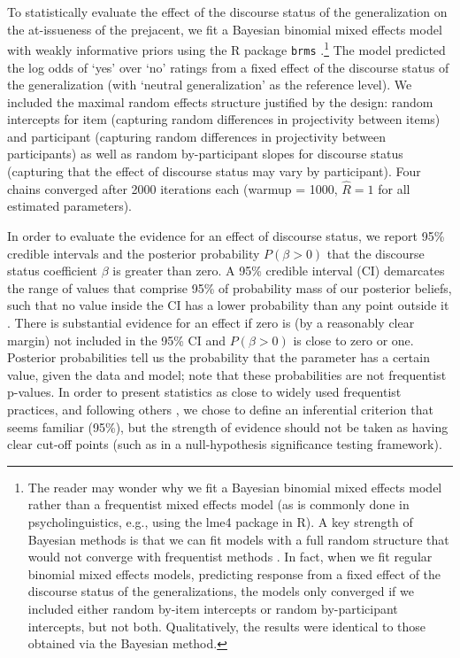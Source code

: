 \documentclass[11pt,fleqn]{article}
\newcommand{\6}{\mbox{$[\hspace*{-.6mm}[$}}
\newcommand{\9}{\mbox{$]\hspace*{-.6mm}]$}}
\begin{document}
To statistically evaluate the effect of the discourse status of the generalization on the at-issueness of the prejacent, we fit a Bayesian binomial mixed effects model with weakly informative priors using the R package \verb|brms| \citep{buerkner2017}.\footnote{The reader may wonder why we fit a Bayesian binomial mixed effects model rather than a frequentist mixed effects model (as is commonly done in psycholinguistics, e.g., using the lme4 package in R). A key strength of Bayesian methods is that we can fit models with a full random structure that would not converge with frequentist
methods \citep{Nicenboim2016}. In fact, when we fit regular binomial mixed effects models, predicting response from a fixed effect of the discourse status of the generalizations, the models only converged if we included either random by-item intercepts or random by-participant intercepts, but not both. Qualitatively, the results were identical to those obtained via the Bayesian method.} The model predicted the log odds of `yes' over `no' ratings from a fixed effect of the discourse status of the generalization (with `neutral generalization' as the reference level). We included the maximal random effects structure justified by the design: random intercepts for item (capturing random differences in projectivity between items) and participant (capturing random differences in projectivity between participants) as well as random by-participant slopes for discourse status (capturing that the effect of discourse status may vary by participant). Four chains converged after 2000 iterations each (warmup = 1000, \(\hat{R}=1\) for all estimated parameters).

In order to evaluate the evidence for an effect of discourse status, we report 95\% credible intervals and the posterior probability $P(\beta > 0)$ that the discourse status coefficient $\beta$ is greater than zero. A 95\% credible interval (CI) demarcates the range of values that comprise 95\% of probability mass of our posterior beliefs, such that no value inside the CI has a lower probability than any point outside it \citep{Jaynes1976, Morey2016}. There is substantial evidence for an effect if zero is (by a reasonably clear margin) not included in the 95\% CI and $P(\beta > 0)$ is close to zero or one. Posterior probabilities tell us the probability that the parameter has a certain value, given the data and model; note that these probabilities are not frequentist p-values. In order to present statistics as close to widely used frequentist practices, and following others \citep{Nicenboim2016}, we chose to define an inferential criterion that seems familiar (95\%), but the strength of evidence should not be taken as having clear cut-off points (such as in a null-hypothesis significance testing framework).
\end{document}
